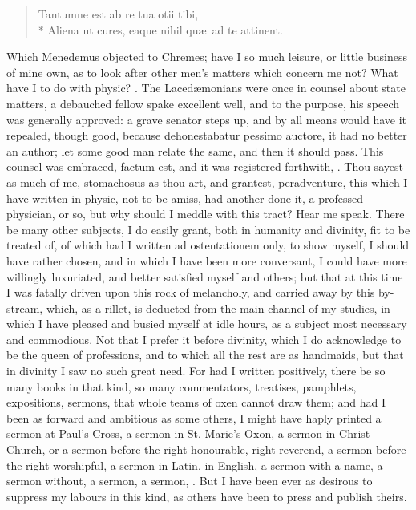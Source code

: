 {\begin{verse}
\textlatin{Tantumne est ab re tua otii tibi,}\\*
\textlatin{Aliena ut cures, eaque nihil qu\ae{}\ ad te attinent.}
\end{verse}

Which Menedemus objected to Chremes; have I so much leisure, or little
business of mine own, as to look after other men's matters which
concern me not? What have I to do with physic? . The Laced\ae{}monians were once in counsel about
state matters, a debauched fellow spake excellent well, and to the
purpose, his speech was generally approved: a grave senator steps up,
and by all means would have it repealed, though good, because
dehonestabatur pessimo auctore, it had no better an author; let some
good man relate the same, and then it should pass. This counsel was
embraced, factum est, and it was registered forthwith, . Thou sayest as much of me,
stomachosus as thou art, and grantest, peradventure, this which I have
written in physic, not to be amiss, had another done it, a professed
physician, or so, but why should I meddle with this tract? Hear me
speak. There be many other subjects, I do easily grant, both in
humanity and divinity, fit to be treated of, of which had I written ad
ostentationem only, to show myself, I should have rather chosen, and in
which I have been more conversant, I could have more willingly
luxuriated, and better satisfied myself and others; but that at this
time I was fatally driven upon this rock of melancholy, and carried
away by this by-stream, which, as a rillet, is deducted from the main
channel of my studies, in which I have pleased and busied myself at
idle hours, as a subject most necessary and commodious. Not that I
prefer it before divinity, which I do acknowledge to be the queen of
professions, and to which all the rest are as handmaids, but that in
divinity I saw no such great need. For had I written positively, there
be so many books in that kind, so many commentators, treatises,
pamphlets, expositions, sermons, that whole teams of oxen cannot draw
them; and had I been as forward and ambitious as some others, I might
have haply printed a sermon at Paul's Cross, a sermon in St. Marie's
Oxon, a sermon in Christ Church, or a sermon before the right
honourable, right reverend, a sermon before the right worshipful, a
sermon in Latin, in English, a sermon with a name, a sermon without, a
sermon, a sermon, \etc. But I have been ever as desirous to suppress my
labours in this kind, as others have been to press and publish theirs.

}

